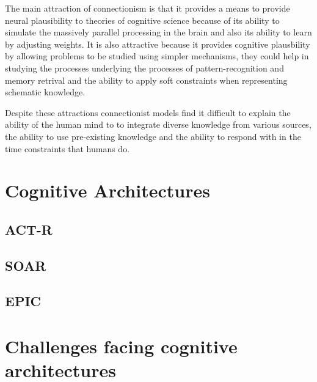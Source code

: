      The main attraction of connectionism is that it provides a means
     to provide neural plausibility\cite{103009} to theories of
     cognitive science because of its ability to simulate the
     massively parallel processing in the brain and also its ability
     to learn by adjusting weights. It is also attractive because it
     provides cognitive plausbility by allowing problems to be studied
     using simpler mechanisms, they could help in studying the
     processes underlying the processes of pattern-recognition and
     memory retrival and the ability to apply soft constraints when
     representing schematic knowledge.

     Despite these attractions connectionist models find it difficult
     to explain the ability of the human mind to to integrate diverse
     knowledge from various sources, the ability to use pre-existing
     knowledge and the ability to respond with in the time constraints
     that humans do.

     
\section{Cognitive Architectures}


\subsection{ACT-R}
\subsection{SOAR}
\subsection{EPIC}
\section{Challenges facing cognitive architectures}
